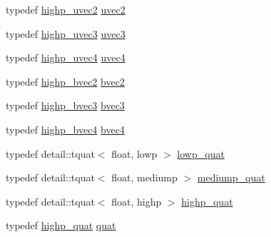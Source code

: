 \begin{CompactItemize}
\item 
typedef \hyperlink{group__core__precision_gaf92be4c1fca33cff90c1ed15b521c79}{highp\_\-uvec2} \hyperlink{group__core__types_gfd2041b45eff671aa8899d2c2835eee9}{uvec2}
\item 
typedef \hyperlink{group__core__precision_g66d0e4ae1742ede2eb32bf0bfedd7474}{highp\_\-uvec3} \hyperlink{group__core__types_gc4ba593917841b859ba1683b8b52b8fa}{uvec3}
\item 
typedef \hyperlink{group__core__precision_g7cb8cc501f7e680e1889b93eb80e6c46}{highp\_\-uvec4} \hyperlink{group__core__types_g1c426d19627b32b14f0089f7f4ba7b1d}{uvec4}
\item 
typedef \hyperlink{group__core__precision_g4153415d1f3d390219ac9464652ac377}{highp\_\-bvec2} \hyperlink{group__core__types_g7523cf292181cf7daef3aa0a3267d8e3}{bvec2}
\item 
typedef \hyperlink{group__core__precision_g1d77a773fdd024602413670788c10c62}{highp\_\-bvec3} \hyperlink{group__core__types_g3f07d6d37fc6fe875170fd5799685bcf}{bvec3}
\item 
typedef \hyperlink{group__core__precision_g381539af52c5e5c659700e12fb706eaf}{highp\_\-bvec4} \hyperlink{group__core__types_g6bb211b3d3bebae3867548d5673ca5cd}{bvec4}
\item 
typedef detail::tquat$<$ float, lowp $>$ \hyperlink{namespaceglm_efc1d896fa40939955d68b2c68c33cc8}{lowp\_\-quat}
\item 
typedef detail::tquat$<$ float, mediump $>$ \hyperlink{namespaceglm_a891775f83d9da605b5dd0dc34a3ef62}{mediump\_\-quat}
\item 
typedef detail::tquat$<$ float, highp $>$ \hyperlink{namespaceglm_8d2836172e6561f6519c39d0b5d025c1}{highp\_\-quat}
\item 
\hypertarget{namespaceglm_c1f6a5957091b849730ea6f05a6b7ad6}{
typedef \hyperlink{namespaceglm_8d2836172e6561f6519c39d0b5d025c1}{highp\_\-quat} \hyperlink{namespaceglm_c1f6a5957091b849730ea6f05a6b7ad6}{quat}}
\label{namespaceglm_c1f6a5957091b849730ea6f05a6b7ad6}


\end{CompactItemize}
